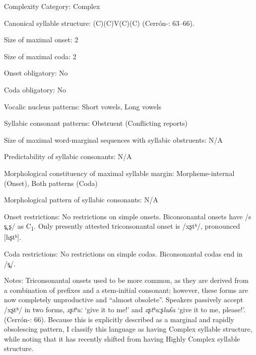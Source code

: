 {\begin{appendixdesc}
\item[Complexity Category:] Complex

\item[Canonical syllable structure:] (C)(C)V(C)(C) (Cerrón-\citealt{Palomino2006}: 63--66).

\item[Size of maximal onset:] 2

\item[Size of maximal coda:] 2

\item[Onset obligatory:] No

\item[Coda obligatory:] No

\item[Vocalic nucleus patterns:] Short vowels, Long vowels

\item[Syllabic consonant patterns:] Obstruent (Conflicting reports)

\item[Size of maximal word-marginal sequences with syllabic obstruents:] N/A

\item[Predictability of syllabic consonants:] N/A

\item[Morphological constituency of maximal syllable margin:] Morpheme-internal (Onset), Both patterns (Coda)

\item[Morphological pattern of syllabic consonants:] N/A

\item[Onset restrictions:] No restrictions on simple onsets. Biconsonantal onsets have /s s̪ ʂ/ as C\textsubscript{1}. Only presently attested triconsonantal onset is /xʂtʰ/, pronounced [hʂtʰ].

\item[Coda restrictions:] No restrictions on simple codas. Biconsonantal codas end in /s̪/.

\item[Notes:] Triconsonantal onsets used to be more common, as they are derived from a combination of prefixes and a stem-initial consonant; however, these forms are now completely unproductive and “almost obsolete”. Speakers passively accept /xʂtʰ/ in two forms, \textit{xʂtʰaː} ‘give it to me!’ and \textit{xʂtʰaːʂlaʎa} ‘give it to me, please!’. (Cerrón-\citealt{Palomino2006}: 66). Because this is explicitly described as a marginal and rapidly obsolescing pattern, I classify this language as having Complex syllable structure, while noting that it has recently shifted from having Highly Complex syllable structure.
\end{appendixdesc}
}
